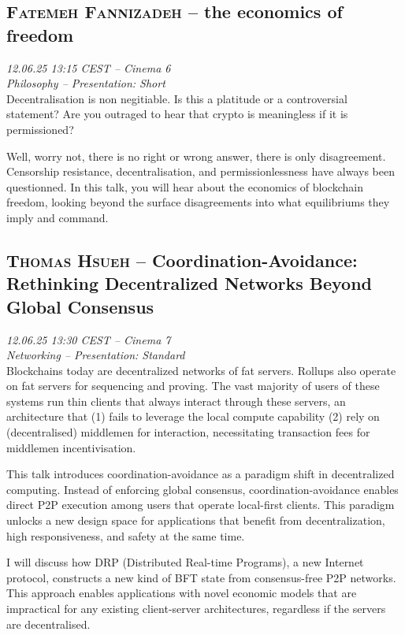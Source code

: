 \clearpage
\subsection {\textsc{Fatemeh Fannizadeh}  -- the economics of freedom} \noindent \textit {12.06.25 13:15 CEST -- Cinema 6\\ Philosophy -- Presentation: Short}\\[1em] Decentralisation is non negitiable. Is this a platitude or a controversial statement? Are you outraged to hear that crypto is meaningless if it is permissioned?

Well, worry not, there is no right or wrong answer, there is only disagreement. Censorship resistance, decentralisation, and permissionlessness have always been questionned. In this talk, you will hear about the economics of blockchain freedom, looking beyond the surface disagreements into what equilibriums they imply and command.

\clearpage
\subsection {\textsc{Thomas Hsueh}  -- Coordination-Avoidance: Rethinking Decentralized Networks Beyond Global Consensus} \noindent \textit {12.06.25 13:30 CEST -- Cinema 7\\ Networking -- Presentation: Standard}\\[1em] Blockchains today are decentralized networks of fat servers. Rollups also operate on fat servers for sequencing and proving. The vast majority of users of these systems run thin clients that always interact through these servers, an architecture that (1) fails to leverage the local compute capability (2) rely on (decentralised) middlemen for interaction, necessitating transaction fees for middlemen incentivisation.

This talk introduces coordination-avoidance as a paradigm shift in decentralized computing. Instead of enforcing global consensus, coordination-avoidance enables direct P2P execution among users that operate local-first clients. This paradigm unlocks a new design space for applications that benefit from decentralization, high responsiveness, and safety at the same time.

I will discuss how DRP (Distributed Real-time Programs), a new Internet protocol, constructs a new kind of BFT state from consensus-free P2P networks. This approach enables applications with novel economic models that are impractical for any existing client-server architectures, regardless if the servers are decentralised.

